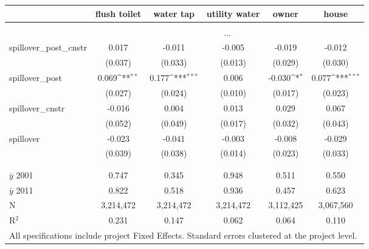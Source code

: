 {\footnotesize
{}  
\def\sym#1{\ifmmode^{#1}\else\(^{#1}\)\fi}
\begin{tabular}{l*{5}{c}}
          &\multicolumn{1}{c}{flush toilet}         &\multicolumn{1}{c}{water tap}         &\multicolumn{1}{c}{utility water}         &\multicolumn{1}{c}{owner}         &\multicolumn{1}{c}{house}         \\[0.2em]
\hline\\[-0.9em]
& \multicolumn{5}{c}{...}\\
[.5em]
\rowcolor{o} {\scriptsize spillover\_post\_cnstr}  &  0.017    &   -0.011     &   -0.005    &   -0.019    &   -0.012   \\
\rowcolor{o}                & (0.037)   &  (0.033)     &  (0.013)    &  (0.029)    &  (0.030)         \\
[.5em]
{\scriptsize spillover\_post}& 0.069\sym{**} &  0.177\sym{***}&  0.006    &   -0.030\sym{*}  &    0.077\sym{***}\\
               &  (0.027)      &  (0.024)       &  (0.010)  &  (0.017)         &  (0.023)  \\       
[.5em]
{\scriptsize spillover\_cnstr} & -0.016   &    0.004       &    0.013  &    0.029         &    0.067      \\
                   & (0.052)  &  (0.049)       &  (0.017)  &  (0.032)         &  (0.043)         \\
[.5em]
{\scriptsize spillover} &  -0.023    &   -0.041    &   -0.003    &   -0.008    &   -0.029         \\
          &  (0.039)   &  (0.038)    &  (0.014)    &  (0.023)    &  (0.033)         \\
          \\[-0.9em]
\hline \\[-0.9em]
$\bar{y}$ 2001& 0.747      &    0.345        &    0.948      &    0.511         &    0.550         \\
$\bar{y}$ 2011& 0.822      &    0.518        &    0.936      &    0.457         &    0.623         \\
N          &  3,214,472    &  3,214,472      &  3,214,472    &  3,112,425       &  3,067,560       \\
R$^{2}$    &    0.231      &    0.147        &    0.062      &    0.064         &    0.110         \\
\hline
\multicolumn{6}{l}{\tiny All specifications include project Fixed Effects. Standard errors clustered at the project level.}
\end{tabular}
}
